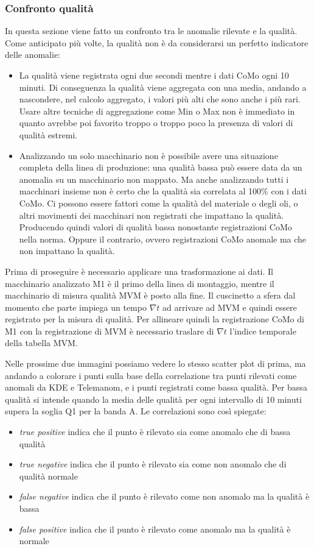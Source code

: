 \subsubsection{Confronto qualità}
In questa sezione viene fatto un confronto tra le anomalie rilevate e la qualità. Come anticipato più volte, la qualità non è da considerarsi un perfetto indicatore delle anomalie: 
\begin{itemize}
	\item La qualità viene registrata ogni due secondi mentre i dati CoMo ogni 10 minuti. Di conseguenza la qualità viene aggregata con una media, andando a nascondere, nel calcolo aggregato, i valori più alti che sono anche i più rari. Usare altre tecniche di aggregazione come Min o Max non è immediato in quanto avrebbe poi favorito troppo o troppo poco la presenza di valori di qualità estremi.
	\item Analizzando un solo macchinario non è possibile avere una situazione completa della linea di produzione: una qualità bassa può essere data da un anomalia su un macchinario non mappato. Ma anche analizzando tutti i macchinari insieme non è certo che la qualità sia correlata al 100\% con i dati CoMo. Ci possono essere fattori come la qualità del materiale o degli oli, o altri movimenti dei macchinari non registrati che impattano la qualità. Producendo quindi valori di qualità bassa nonostante registrazioni CoMo nella norma. Oppure il contrario, ovvero registrazioni CoMo anomale ma che non impattano la qualità.
\end{itemize}

Prima di proseguire è necessario applicare una trasformazione ai dati. Il macchinario analizzato M1 è il primo della linea di montaggio, mentre il macchinario di misura qualità MVM è posto alla fine. Il cuscinetto a sfera dal momento che parte impiega un tempo ${\nabla}t$ ad arrivare ad MVM e quindi essere registrato per la misura di qualità. Per allineare quindi la registrazione CoMo di M1 con la registrazione di MVM è necessario traslare di ${\nabla}t$ l'indice temporale della tabella MVM.

Nelle prossime due immagini possiamo vedere lo stesso scatter plot di prima, ma andando a colorare i punti sulla base della correlazione tra punti rilevati come anomali da KDE e Telemanom, e i punti registrati come bassa qualità. Per bassa qualità si intende quando la media delle qualità per ogni intervallo di 10 minuti supera la soglia Q1 per la banda A. Le correlazioni sono così spiegate:
\begin{itemize}
	\item \textit{true positive} indica che il punto è rilevato sia come anomalo che di bassa qualità
	\item \textit{true negative} indica che il punto è rilevato sia come non anomalo che di qualità normale
	\item \textit{false negative} indica che il punto è rilevato come non anomalo ma la qualità è bassa
	\item \textit{false positive} indica che il punto è rilevato come anomalo ma la qualità è normale
\end{itemize}

